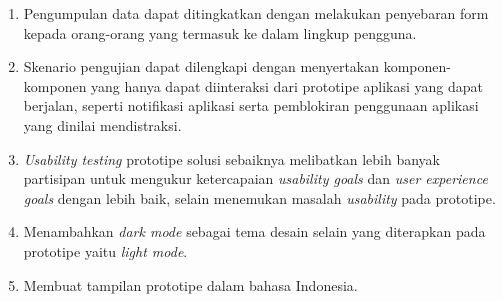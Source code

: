 \begin{enumerate}
  \item Pengumpulan data dapat ditingkatkan dengan melakukan penyebaran form kepada orang-orang yang termasuk ke dalam lingkup pengguna.
  
  
  \item Skenario pengujian dapat dilengkapi dengan menyertakan komponen-komponen yang hanya dapat diinteraksi dari prototipe aplikasi yang dapat berjalan, seperti notifikasi aplikasi serta pemblokiran penggunaan aplikasi yang dinilai mendistraksi.
  
  \item \textit{Usability testing} prototipe solusi sebaiknya melibatkan lebih banyak partisipan untuk mengukur ketercapaian \textit{usability goals} dan \textit{user experience goals} dengan lebih baik, selain menemukan masalah \textit{usability} pada prototipe.
  
  \item Menambahkan \textit{dark mode} sebagai tema desain selain yang diterapkan pada prototipe yaitu \textit{light mode}.
  
  \item Membuat tampilan prototipe dalam bahasa Indonesia.
\end{enumerate}
